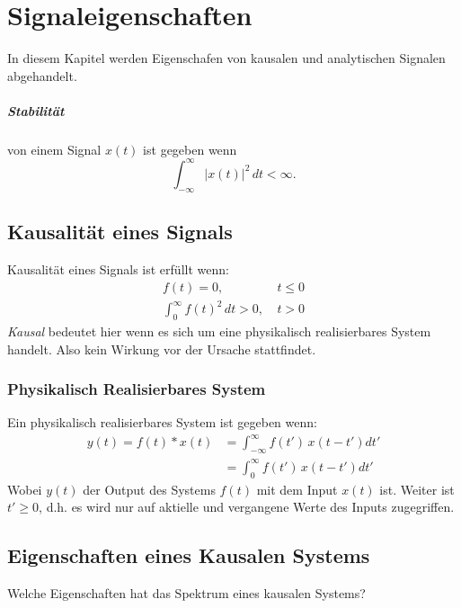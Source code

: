 \chapter{Signaleigenschaften}

In diesem Kapitel werden Eigenschafen von kausalen und analytischen Signalen abgehandelt.\\

\paragraph{Stabilität} von einem Signal $x(t)$ ist gegeben wenn
\begin{equation}
\int_{-\infty}^\infty |x(t)|^2\,dt < \infty.
\end{equation}

\section{Kausalität eines Signals}
Kausalität eines Signals ist erfüllt wenn:
\[
\begin{split}
f(t) = 0 ,&\:t \leq 0\\
\int_0^\infty f(t)^2\,dt > 0,&\:t > 0
\end{split}
\]
\textit{Kausal} bedeutet hier wenn es sich um eine physikalisch realisierbares System handelt. Also kein Wirkung vor der Ursache stattfindet.

\subsection{Physikalisch Realisierbares System}
Ein physikalisch realisierbares System ist gegeben wenn:
\begin{equation}
\begin{split}
y(t) = f(t) * x(t) & = \int_{-\infty}^\infty f(t')\, x(t-t') dt'\\
& =\int_0^\infty f(t')\, x(t-t') dt'
\end{split}
\end{equation}
Wobei $y(t)$ der Output des Systems $f(t)$ mit dem Input $x(t)$ ist. Weiter ist $t' \geq 0$, d.h. es wird nur auf aktielle und vergangene Werte des Inputs zugegriffen.

\section{Eigenschaften eines Kausalen Systems}
Welche Eigenschaften hat das Spektrum eines kausalen Systems?

